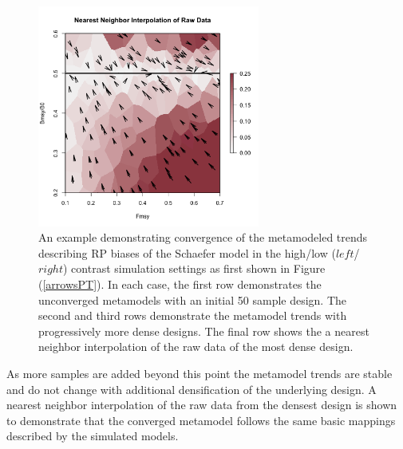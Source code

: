 {\begin{figure}[h!]
\begin{minipage}[h!]{0.49\textwidth}
\includegraphics[width=0.65\textwidth]{../edits/obsDirectionalBiasSubFlatT30nF1.png}
\end{minipage}
\caption{ \label{edit2}
An example demonstrating convergence of the metamodeled trends describing RP biases of 
the Schaefer model in the high/low ($left$/$right$) contrast simulation settings as first 
shown in Figure (\ref{arrowsPT}). In each case, %
the first row demonstrates the unconverged metamodels with an initial 50 sample design. %
The second and third rows demonstrate the metamodel trends with progressively more dense designs. 
The final row shows the a nearest neighbor interpolation of the raw data of the most dense design.
}
\end{figure} 



%
\clearpage
\noindent
As more samples are added beyond this point the metamodel trends are stable 
and do not change with additional densification of the underlying design. A 
nearest neighbor interpolation of the raw data from the densest design is 
shown to demonstrate that the converged metamodel follows the same basic 
mappings described by the simulated models.%

}
